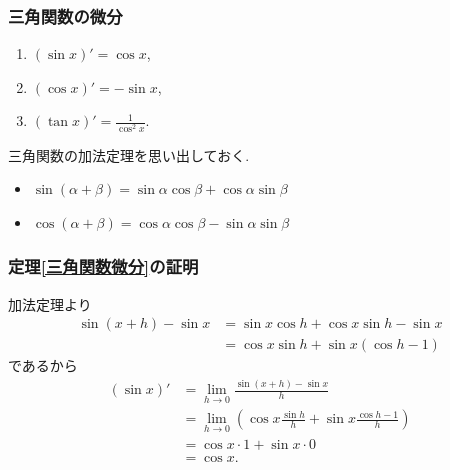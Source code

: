 \begin{frame}
\frametitle{三角関数の微分}



\begin{Thm} \label{三角関数微分}
\begin{enumerate}
\item $(\sin x)'=\cos x$,
\item  $(\cos x)' = -\sin x$,
\item $(\tan x)'=\frac{1}{\cos^2 x}$. 
\end{enumerate}
\end{Thm}

三角関数の加法定理を思い出しておく. 
\begin{itemize}
\item $\sin(\alpha+\beta)=\sin \alpha \cos \beta + \cos \alpha \sin \beta$
\item $\cos(\alpha+\beta)=\cos \alpha \cos \beta - \sin \alpha \sin \beta$
\end{itemize}

\end{frame}




\begin{frame}
\frametitle{定理\ref{三角関数微分}の証明}

加法定理より
\begin{align*}
\sin(x +h)-\sin x & = \sin x \cos h + \cos x \sin h -\sin x \\
& =  \cos x \sin h + \sin x( \cos h-1)
\end{align*}
であるから
\begin{align*}
(\sin x)' &= \lim_{h \to 0} \frac{\sin(x +h)-\sin x}{h} \\
& =  \lim_{h \to 0} (\cos x \frac{\sin h}{h} + \sin x \frac{\cos h-1}{h}) \\
& =\cos x \cdot 1 + \sin x \cdot 0 \\
& = \cos x. 
\end{align*}
\end{frame}




